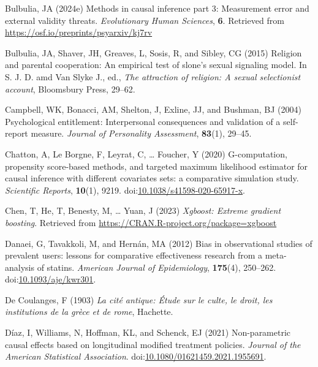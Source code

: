 \documentclass[
  single column]{article}
\newlength{\cslhangindent}
\newenvironment{CSLReferences}[2] %
 {\begin{list}{}{%
  \setlength{\itemindent}{0pt}
  \setlength{\leftmargin}{0pt}
  \setlength{\parsep}{0pt}
  \ifodd #1
   \setlength{\leftmargin}{\cslhangindent}
   \setlength{\itemindent}{-1\cslhangindent}
  \fi
  \setlength{\itemsep}{#2\baselineskip}}}
 {\end{list}}
\begin{document}
\begin{CSLReferences}{1}{0}
Bulbulia, JA (2024e) Methods in causal inference part 3: Measurement
error and external validity threats. \emph{Evolutionary Human Sciences},
\textbf{6}. Retrieved from \url{https://osf.io/preprints/psyarxiv/kj7rv}

Bulbulia, JA, Shaver, JH, Greaves, L, Sosis, R, and Sibley, CG (2015)
Religion and parental cooperation: An empirical test of slone's sexual
signaling model. In S. J. D. amd Van Slyke J., ed., \emph{The attraction
of religion: A sexual selectionist account}, Bloomsbury Press, 29--62.

Campbell, WK, Bonacci, AM, Shelton, J, Exline, JJ, and Bushman, BJ
(2004) Psychological entitlement: Interpersonal consequences and
validation of a self-report measure. \emph{Journal of Personality
Assessment}, \textbf{83}(1), 29--45.

Chatton, A, Le Borgne, F, Leyrat, C, \ldots{} Foucher, Y (2020)
G-computation, propensity score-based methods, and targeted maximum
likelihood estimator for causal inference with different covariates
sets: a comparative simulation study. \emph{Scientific Reports},
\textbf{10}(1), 9219.
doi:\href{https://doi.org/10.1038/s41598-020-65917-x}{10.1038/s41598-020-65917-x}.

Chen, T, He, T, Benesty, M, \ldots{} Yuan, J (2023) \emph{Xgboost:
Extreme gradient boosting}. Retrieved from
\url{https://CRAN.R-project.org/package=xgboost}

Danaei, G, Tavakkoli, M, and Hernán, MA (2012) Bias in observational
studies of prevalent users: lessons for comparative effectiveness
research from a meta-analysis of statins. \emph{American Journal of
Epidemiology}, \textbf{175}(4), 250--262.
doi:\href{https://doi.org/10.1093/aje/kwr301}{10.1093/aje/kwr301}.

De Coulanges, F (1903) \emph{La cité antique: Étude sur le culte, le
droit, les institutions de la grèce et de rome}, Hachette.

Díaz, I, Williams, N, Hoffman, KL, and Schenck, EJ (2021) Non-parametric
causal effects based on longitudinal modified treatment policies.
\emph{Journal of the American Statistical Association}.
doi:\href{https://doi.org/10.1080/01621459.2021.1955691}{10.1080/01621459.2021.1955691}.


\end{CSLReferences}
\end{document}
